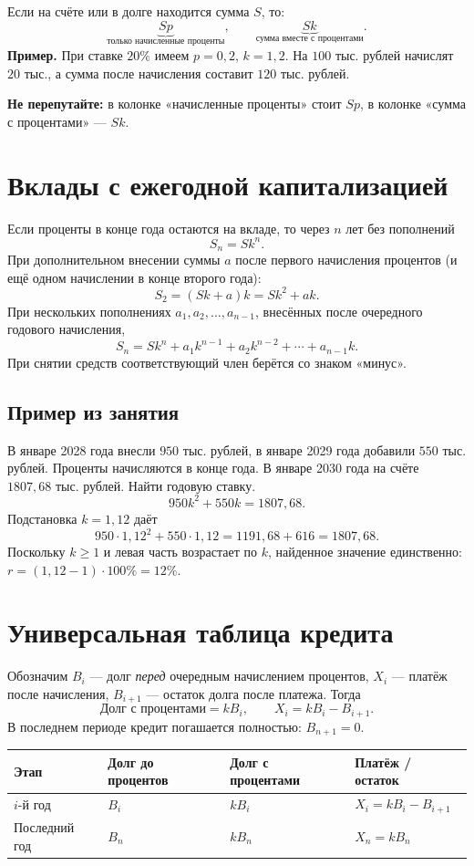 \documentclass[a4paper,12pt]{article}
\begin{document}
Если на счёте или в долге находится сумма \(S\), то:
\[
\underbrace{Sp}_{\text{только начисленные проценты}},\qquad
\underbrace{Sk}_{\text{сумма вместе с процентами}}.
\]
\textbf{Пример.} При ставке \(20\%\) имеем \(p=0,2\), \(k=1,2\).
На \(100\) тыс. рублей начислят \(20\) тыс., а сумма после начисления
составит \(120\) тыс. рублей.

\textbf{Не перепутайте:} в колонке «начисленные проценты» стоит \(Sp\),
в колонке «сумма с процентами» --- \(Sk\).

\section{Вклады с ежегодной капитализацией}
Если проценты в конце года остаются на вкладе, то через \(n\) лет без пополнений
\[
\boxed{S_n=Sk^n}.
\]
При дополнительном внесении суммы \(a\) после первого начисления процентов
(и ещё одном начислении в конце второго года):
\[
\boxed{S_2=(Sk+a)k=Sk^2+ak}.
\]
При нескольких пополнениях \(a_1,a_2,\ldots,a_{n-1}\), внесённых после очередного годового начисления,
\[
S_n=Sk^n+a_1k^{n-1}+a_2k^{n-2}+\cdots+a_{n-1}k.
\]
При снятии средств соответствующий член берётся со знаком «минус».

\subsection*{Пример из занятия}
В январе 2028 года внесли \(950\) тыс. рублей, в январе 2029 года добавили
\(550\) тыс. рублей. Проценты начисляются в конце года. В январе 2030 года
на счёте \(1807,68\) тыс. рублей. Найти годовую ставку.
\[
950k^2+550k=1807,68.
\]
Подстановка \(k=1,12\) даёт
\[
950\cdot1,12^2+550\cdot1,12=1191,68+616=1807,68.
\]
Поскольку \(k\ge1\) и левая часть возрастает по \(k\), найденное
значение единственно: \(r=(1,12-1)\cdot100\%=\boxed{12\%}\).

\section{Универсальная таблица кредита}
Обозначим \(B_i\) --- долг \emph{перед} очередным начислением процентов,
\(X_i\) --- платёж после начисления, \(B_{i+1}\) --- остаток долга
после платежа. Тогда
\[
\boxed{\text{Долг с процентами}=kB_i,\qquad
X_i=kB_i-B_{i+1}.}
\]
В последнем периоде кредит погашается полностью: \(B_{n+1}=0\).

\renewcommand{\arraystretch}{1.3}
\begin{center}
\begin{tabularx}{\linewidth}{@{}lXXX@{}}
\toprule
Этап & Долг до процентов & Долг с процентами & Платёж / остаток \\
\midrule
\(i\)-й год & \(B_i\) & \(kB_i\) & \(X_i=kB_i-B_{i+1}\) \\
Последний год & \(B_n\) & \(kB_n\) & \(X_n=kB_n\) \\
\bottomrule
\end{tabularx}
\end{center}
\end{document}
